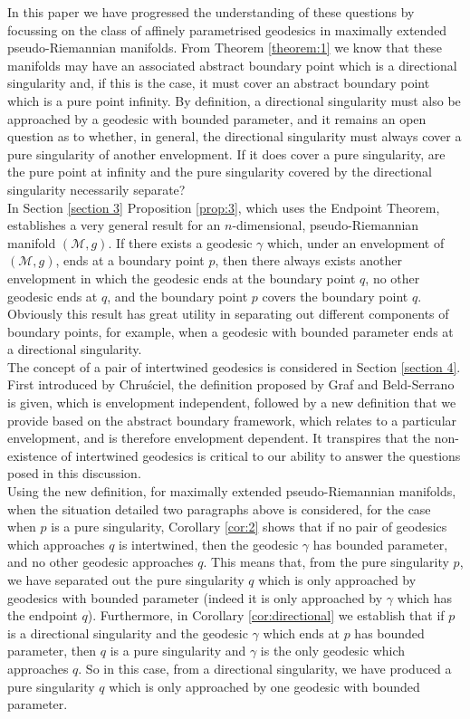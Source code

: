 \documentclass[pdflatex,sn-mathphys-num]{sn-jnl}
\theoremstyle{definition}
\begin{document}
In this paper we have progressed the understanding of these questions by focussing on the class of affinely parametrised geodesics in maximally extended pseudo-Riemannian manifolds. From Theorem \ref{theorem:1} we know that these manifolds may have an associated abstract boundary point which is a directional singularity and, if this is the case, it must cover an abstract boundary point which is a pure point infinity. By definition, a directional singularity must also be approached by a geodesic with bounded parameter, and it remains an open question as to whether, in general, the directional singularity must always cover a pure singularity of another envelopment. If it does cover a pure singularity, are the pure point at infinity and the pure singularity covered by the directional singularity necessarily separate? \\

In Section \ref{section 3} Proposition \ref{prop:3}, which uses the Endpoint Theorem, establishes a very general result for an $n$-dimensional, pseudo-Riemannian manifold $(\mathcal{M},g)$. If there exists a geodesic $\gamma$ which, under an envelopment of $(\mathcal{M},g)$, ends at a boundary point $p$, then there always exists another envelopment in which the geodesic ends at the boundary point $q$, no other geodesic ends at $q$, and the boundary point $p$ covers the boundary point $q$. Obviously this result has great utility in separating out different components of boundary points, for example, when a geodesic with bounded parameter ends at a directional singularity.\\

The concept of a pair of intertwined geodesics is considered in Section \ref{section 4}. First introduced by Chru\'{s}ciel, the definition proposed by Graf and Beld-Serrano is given, which is envelopment independent, followed by a new definition that we provide based on the abstract boundary framework, which relates to a particular envelopment, and is therefore envelopment dependent. It transpires that the non-existence of intertwined geodesics is critical to our ability to answer the questions posed in this discussion.\\

Using the new definition, for maximally extended pseudo-Riemannian manifolds, when the situation detailed two paragraphs above is considered, for the case when $p$ is a pure singularity, Corollary \ref{cor:2} shows that if no pair of geodesics which approaches $q$ is intertwined, then the geodesic $\gamma$ has bounded parameter, and no other geodesic approaches $q$. This means that, from the pure singularity $p$, we have separated out the pure singularity $q$ which is only approached by geodesics with bounded parameter (indeed it is only approached by $\gamma$ which has the endpoint $q$). Furthermore, in Corollary \ref{cor:directional} we establish that if $p$ is a directional singularity and the geodesic $\gamma$ which ends at $p$ has bounded parameter, then $q$ is a pure singularity and $\gamma$ is the only geodesic which approaches $q$. So in this case, from a directional singularity, we have produced a pure singularity $q$ which is only approached by one geodesic with bounded parameter.\\
\end{document}
